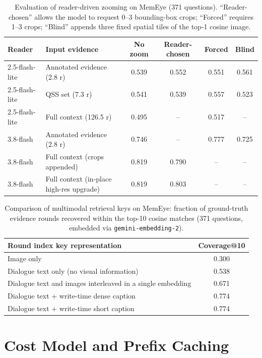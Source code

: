 \documentclass[10pt]{article}
\newcommand{\qss}{QSS}
\begin{document}
\begin{table}[h]
\centering
\caption{Evaluation of reader-driven zooming on MemEye (371 questions). ``Reader-chosen'' allows the model to request 0--3 bounding-box crops; ``Forced'' requires 1--3 crops; ``Blind'' appends three fixed spatial tiles of the top-1 cosine image.}
\label{tab:zoom}
\small
\begin{tabular}{llcccc}
\toprule
Reader & Input evidence & No zoom & Reader-chosen & Forced & Blind \\
\midrule
2.5-flash-lite & Annotated evidence (2.8 r) & 0.539 & 0.552 & 0.551 & 0.561 \\
2.5-flash-lite & \qss{} set (7.3 r) & 0.541 & 0.539 & 0.557 & 0.523 \\
2.5-flash-lite & Full context (126.5 r) & 0.495 & -- & 0.517 & -- \\
3.8-flash & Annotated evidence (2.8 r) & 0.746 & -- & 0.777 & 0.725 \\
3.8-flash & Full context (crops appended) & 0.819 & 0.790 & -- & -- \\
3.8-flash & Full context (in-place high-res upgrade) & 0.819 & 0.803 & -- & -- \\
\bottomrule
\end{tabular}
\end{table}

\begin{table}[h]
\centering
\caption{Comparison of multimodal retrieval keys on MemEye: fraction of ground-truth evidence rounds recovered within the top-10 cosine matches (371 questions, embedded via \texttt{gemini-embedding-2}).}
\label{tab:keys}
\small
\begin{tabular}{lc}
\toprule
Round index key representation & Coverage@10 \\
\midrule
Image only & 0.300 \\
Dialogue text only (no visual information) & 0.538 \\
Dialogue text and images interleaved in a single embedding & 0.671 \\
Dialogue text + write-time dense caption & 0.774 \\
Dialogue text + write-time short caption & 0.774 \\
\bottomrule
\end{tabular}
\end{table}

\section{Cost Model and Prefix Caching}
\label{app:cost}
\end{document}
